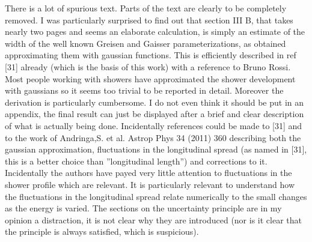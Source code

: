 \documentclass[12pt]{article}
\begin{document}
There is a lot of spurious text. Parts of the text are clearly to be completely removed. I was particularly surprised to find out that section III B, that takes nearly two pages and seems an elaborate
calculation, is simply an estimate of the width of the well known Greisen and Gaisser parameterizations, as obtained approximating them with gaussian functions. This is efficiently described in ref [31]
already (which is the basis of this work) with a reference to Bruno Rossi. Most people working with showers have approximated the shower development with gaussians so it seems too trivial to be reported in
detail. Moreover the derivation is particularly cumbersome. I do not even think it should be put in an appendix, the final result can just be displayed after a brief and clear description of what is actually
being done. Incidentally references could be made to [31] and to the work of Andringa,S. et al. Astrop Phys 34 (2011) 360 describing both the gaussian approximation, fluctuations in the longitudinal spread
(as named in [31], this is a better choice than ''longitudinal length'') and corrections to it. Incidentally the authors have payed very little attention to fluctuations in the shower profile which are relevant. It is particularly relevant to understand how the fluctuations in the longitudinal spread relate numerically to the small changes as the energy is varied. The sections on the uncertainty principle are in my opinion a distraction, it is not clear why they are introduced (nor is it clear that the principle is always satisfied, which is suspicious). 
\end{document}
